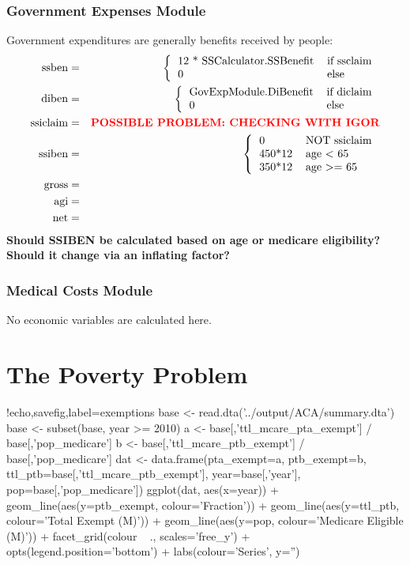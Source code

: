 \documentclass{article}
\begin{document}
\subsubsection{Government Expenses Module}
Government expenditures are generally benefits received by people:
\begin{eqnarray}
{\rm ssben} &=& \left\{\begin{tabular}{ll}12 * {\rm
      SSCalculator.SSBenefit}&{\rm if ssclaim}\\0&{\rm
      else}\end{tabular}\right.\\
{\rm diben} &=& \left\{\begin{tabular}{ll}{\rm
      GovExpModule.DiBenefit}&{\rm if diclaim}\\0&{\rm
      else}\end{tabular}\right.\\
{\rm ssiclaim} &=& \textbf{\color{red}POSSIBLE PROBLEM: CHECKING WITH IGOR}\\
{\rm ssiben} &=& \left\{\begin{tabular}{ll}0&{\rm NOT
      ssiclaim}\\450*12&{\rm age} < 65\\350*12&{\rm age} >=
    65\end{tabular}\right.\\
{\rm gross}&=&\\
{\rm agi}&=&\\
{\rm net}&=&
\end{eqnarray}
\textbf{\color{red} Should SSIBEN be calculated based on age or medicare
  eligibility? Should it change via an inflating factor?}

\subsubsection{Medical Costs Module}
No economic variables are calculated here.

\section{The Poverty Problem}

\begin{Rcode}{!echo,savefig,label=exemptions}
base <- read.dta('../output/ACA/summary.dta')
base <- subset(base, year >= 2010)
a <- base[,'ttl_mcare_pta_exempt'] / base[,'pop_medicare']
b <- base[,'ttl_mcare_ptb_exempt'] / base[,'pop_medicare']
dat <- data.frame(pta_exempt=a, ptb_exempt=b,
ttl_ptb=base[,'ttl_mcare_ptb_exempt'], year=base[,'year'],
pop=base[,'pop_medicare'])
ggplot(dat, aes(x=year)) + 
geom_line(aes(y=ptb_exempt, colour='Fraction')) + 
geom_line(aes(y=ttl_ptb, colour='Total Exempt (M)')) +
geom_line(aes(y=pop, colour='Medicare Eligible (M)')) +
facet_grid(colour ~ ., scales='free_y') +
opts(legend.position='bottom') + labs(colour='Series', y='')
\end{Rcode}
\end{document}
